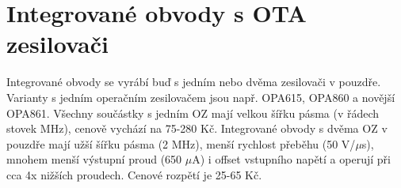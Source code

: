 \documentclass[twoside]{article}
\begin{document}
\section{Integrované obvody s OTA zesilovači}
Integrované obvody se vyrábí buď s jedním nebo dvěma zesilovači v pouzdře. Varianty s jedním operačním zesilovačem jsou např. OPA615, OPA860 a novější OPA861. Všechny součástky s jedním OZ mají velkou šířku pásma (v řádech stovek MHz), cenově vychází na 75-280 Kč. Integrované obvody s dvěma OZ v pouzdře mají užší šířku pásma (2 MHz), menší rychlost přeběhu (50 V/$\mu$s), mnohem menší výstupní proud (650 $\mu$A) i offset vstupního napětí a operují při cca 4x nižších proudech. Cenové rozpětí je 25-65 Kč.
\renewcommand{\arraystretch}{1.5}
\begin{table}[H]
  \caption{\label{tab:Porovnání IO s jedním transkonduktančním OZ }Porovnání IO s jedním transkonduktančním OZ  \cite{5}}
  \end{table}
\end{document}
